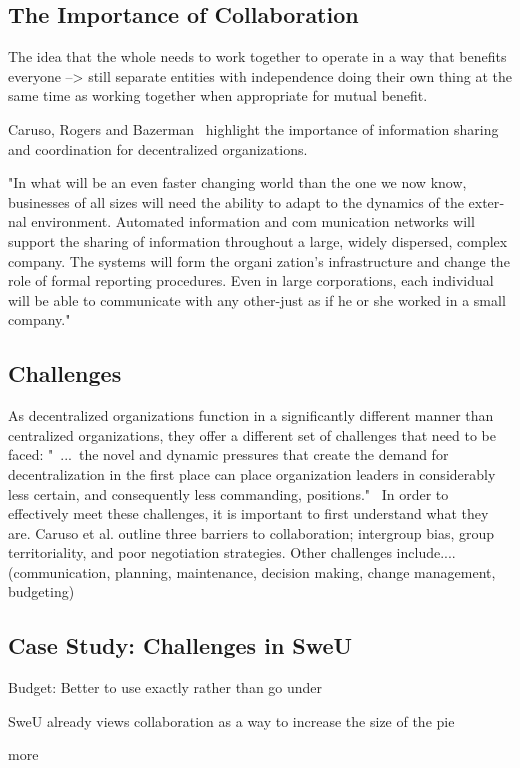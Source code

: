 \subsection{The Importance of Collaboration}
The idea that the whole needs to work together to operate in a way that benefits everyone --> still separate entities with independence doing their own thing at the same time as working together when appropriate for mutual benefit.

Caruso, Rogers and Bazerman~\cite{caruso2008boundaries} highlight the importance of information sharing and coordination for decentralized organizations. 

"In what will be an even faster changing world than the one we now  know,  businesses of all sizes  will need the ability to adapt to the dynamics of the exter­ nal environment. Automated information and com­ munication networks will  support the sharing of information throughout a large, widely  dispersed, complex company. The systems will form the organi­ zation's infrastructure and change the role of formal reporting procedures. Even in large  corporations, each  individual will  be able to communicate with any  other-just as if he or she  worked in  a small company."\cite{applegate1988}


\subsection{Challenges}
As decentralized organizations function in a significantly different manner than centralized organizations, they offer a different set of challenges that need to be faced: "~...~the novel and dynamic pressures that create the demand for decentralization in the first place can place organization leaders in considerably less certain, and consequently less commanding, positions."~\cite{caruso2008boundaries} In order to effectively meet these challenges, it is important to first understand what they are. Caruso et al. outline three barriers to collaboration; intergroup bias, group territoriality, and poor negotiation  strategies. Other challenges include.... (communication, planning, maintenance, decision making, change management, budgeting)

\subsection{Case Study: Challenges in SweU}

Budget: Better to use exactly rather than go under

SweU already views collaboration as a way to increase the size of the pie

more